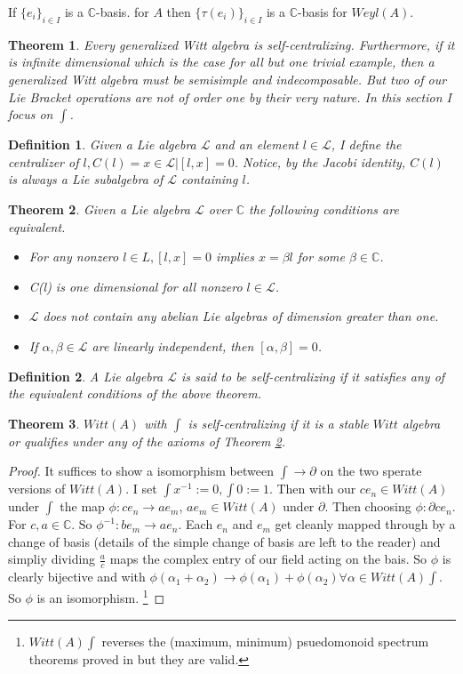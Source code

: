 \documentclass{artjlt}
\newtheorem{thm}{Theorem}
\newtheorem{defn}{Definition}
\newcommand{\?}{\textbackslash}
\newcommand{\C}{\mathbb{C}}
\begin{document}
If $\{ e_i\}_{i \in I}$ is a $\C$-basis.
for $A$ then $\{ \tau(e_i) \}_{i \in I}$
is a $\C$-basis for $Weyl(A)$.
\begin{thm}
Every generalized Witt algebra is self-centralizing. 
Furthermore, if it is infinite dimensional which is the case for all but one trivial example, then a generalized Witt algebra must be semisimple and 
indecomposable. But two of our Lie Bracket operations are not of order one by their very nature. In this section I focus on $\int$.
\end{thm}
\begin{defn}
Given a Lie algebra $\mathcal{L}$ and an element $l \in \mathcal{L}$, I define the
centralizer of $l, C(l) = {x \in \mathcal{L}|[l, x] = 0}$. Notice, by the Jacobi identity, $C(l)$
is always a Lie subalgebra of $\mathcal{L}$ containing $l$.
\end{defn}
\begin{thm} \label{thm:10}
Given a Lie algebra $\mathcal{L}$ over $\C$ the following conditions are equivalent.
\begin{itemize}
\item For any nonzero $l \in L, [l, x] = 0$ implies $x = \beta l$ for some $\beta \in \C$.
\item C(l) is one dimensional for all nonzero $l \in \mathcal{L}$.
\item $\mathcal{L}$ does not contain any abelian Lie algebras of dimension greater than one.
\item If $\alpha, \beta \in \mathcal{L}$ are linearly independent, then $[\alpha, \beta] = 0$.
\end{itemize}
\end{thm}
\begin{defn}
   A Lie algebra $\mathcal{L}$ is said to be self-centralizing if it satisfies any
of the equivalent conditions of the above theorem. 
\end{defn}
\begin{thm}
   $Witt(A)$ with $\int$ is self-centralizing if it is a stable $Witt$ algebra or qualifies under any of the axioms of Theorem \ref{thm:10}.
\end{thm}
\begin{proof}
   It suffices to show a isomorphism between $\int \to \partial$ on the two sperate versions of $Witt(A)$. I set $\int x^{-1} := 0, \int 0 := 1$. Then with our $c e_n \in Witt(A)$ under $\int$ the map $\phi: c e_n \to a e_m$, $a e_m \in Witt(A)$ under $\partial$. Then choosing $\phi: \partial c e_n$. For $c, a \in \C$. So $\phi^{-1}: b e_m \to a e_{n}$. 
   Each $e_n$ and $e_m$ get cleanly mapped through by a change of basis (details of the simple change of basis are left to the reader) and simpliy dividing $\frac{a}{c}$ maps the complex entry of our field acting on the bais. So $\phi$ is clearly bijective and with $\phi(\alpha_1 + \alpha_2) \to \phi(\alpha_1)+ \phi(\alpha_2) \forall \alpha \in Witt(A) \int$. So $\phi$ is an isomorphism.
   \footnote{$Witt(A) \int$ reverses the (maximum, minimum) psuedomonoid spectrum theorems proved in \cite{pakianathan2010generalizedwittalgebrasvariable} but they are valid.} 
  \end{proof}
\end{document}
